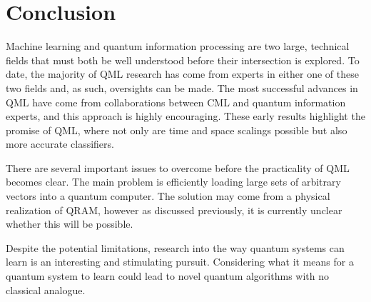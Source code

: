 \chapter{Conclusion}\label{ch:conclusion}
Machine learning and quantum information processing are two large, technical fields that must both be well understood before their intersection is explored. To date, the majority of QML research has come from experts in either one of these two fields and, as such, oversights can be made. The most successful advances in QML have come from collaborations between CML and quantum information experts, and this approach is highly encouraging. These early results highlight the promise of QML, where not only are time and space scalings possible but also more accurate classifiers.\par\bigskip
There are several important issues to overcome before the practicality of QML becomes clear. The main problem is efficiently loading large sets of arbitrary vectors into a quantum computer. The solution may come from a physical realization of QRAM, however as discussed previously, it is currently unclear whether this will be possible.\par\bigskip
Despite the potential limitations, research into the way quantum systems can learn is an interesting and stimulating pursuit. 
Considering what it means for a quantum system to learn could lead to novel quantum algorithms with no classical analogue.
